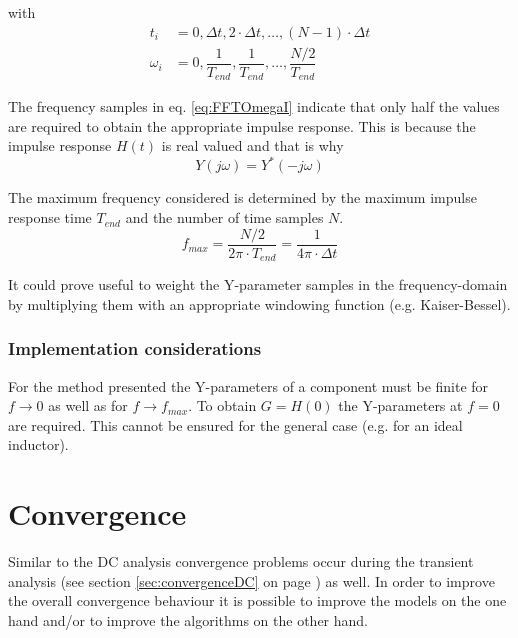 with
\begin{align}
t_i &= 0, \Delta t, 2\cdot\Delta t, \ldots, \left(N-1\right)\cdot\Delta t\\
\label{eq:FFTOmegaI}
\omega_i &= 0, \dfrac{1}{T_{end}}, \dfrac{1}{T_{end}}, \ldots, \dfrac{N/2}{T_{end}}
\end{align}

The frequency samples in eq. \eqref{eq:FFTOmegaI} indicate that only
half the values are required to obtain the appropriate impulse
response.  This is because the impulse response $H\left(t\right)$ is
real valued and that is why
\begin{equation}
Y\left(j\omega\right) = Y^*\left(-j\omega\right)
\end{equation}

The maximum frequency considered is determined by the maximum impulse
response time $T_{end}$ and the number of time samples $N$.
\begin{equation}
f_{max} = \dfrac{N/2}{2\pi\cdot T_{end}} = \dfrac{1}{4\pi\cdot\Delta t}
\end{equation}

It could prove useful to weight the Y-parameter samples in the
frequency-domain by multiplying them with an appropriate windowing
function (e.g. Kaiser-Bessel).

\subsubsection{Implementation considerations}

For the method presented the Y-parameters of a component must be
finite for $f\rightarrow 0$ as well as for $f\rightarrow f_{max}$.  To
obtain $G = H\left(0\right)$ the Y-parameters at $f=0$ are required.
This cannot be ensured for the general case (e.g. for an ideal
inductor).

\section{Convergence}

Similar to the DC analysis convergence problems occur during the
transient analysis (see section \ref{sec:convergenceDC} on page
\pageref{sec:convergenceDC}) as well.  In order to improve the overall
convergence behaviour it is possible to improve the models on the one
hand and/or to improve the algorithms on the other hand.

